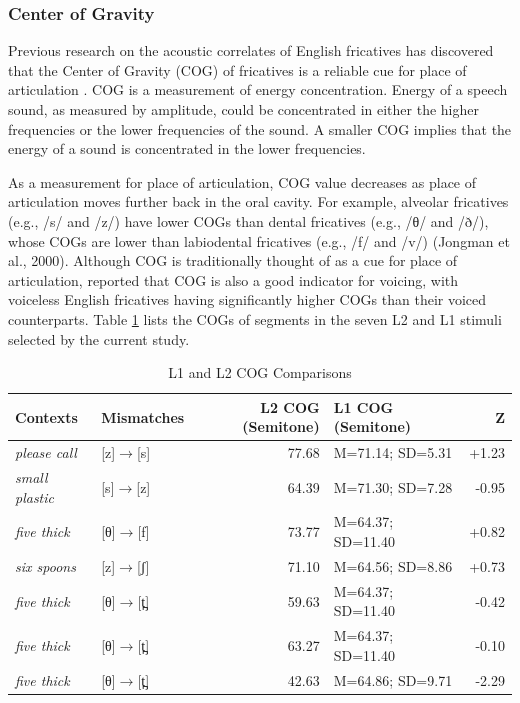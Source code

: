 \subsubsection{Center of Gravity}

Previous research on the acoustic correlates of English fricatives has discovered that the Center of Gravity (COG) of fricatives is a reliable cue for place of articulation \citep{Jongman_2000}. COG is a measurement of energy concentration. Energy of a speech sound, as measured by amplitude, could be concentrated in either the higher frequencies or the lower frequencies of the sound. A smaller COG implies that the energy of a sound is concentrated in the lower frequencies. 

As a measurement for place of articulation, COG value decreases as place of articulation moves further back in the oral cavity. For example, alveolar fricatives (e.g., /s/ and /z/) have lower COGs than dental fricatives (e.g., /θ/ and /ð/), whose COGs are lower than labiodental fricatives (e.g., /f/ and /v/) (Jongman et al., 2000). Although COG is traditionally thought of as a cue for place of articulation, \citet{Jongman_2000} reported that COG is also a good indicator for voicing, with voiceless English fricatives having significantly higher COGs than their voiced counterparts. Table \ref{table:cog} lists the COGs of segments in the seven L2 and L1 stimuli selected by the current study.

\begin{table}[h]
  \figSpace
  \centering
  \caption{L1 and L2 COG Comparisons}
\label{table:cog}
    \begin{tabular}{llrlr}
    \toprule
    Contexts & Mismatches & L2 COG (Semitone) & L1 COG (Semitone)&Z \\
    \midrule
    \textit{please call} & [z]$\rightarrow$[s] & 77.68 & M=71.14; SD=5.31 & +1.23 \\
    \textit{small plastic} & [s]$\rightarrow$[z] & 64.39 & M=71.30; SD=7.28 & -0.95 \\
    \textit{five thick} & [θ]$\rightarrow$[f] & 73.77 & M=64.37; SD=11.40 & +0.82 \\
    \textit{six spoons} & [z]$\rightarrow$[ʃ] & 71.10  & M=64.56; SD=8.86 & +0.73 \\
\textit{five thick}& [θ]$\rightarrow$[t̪] & 59.63 & M=64.37; SD=11.40 & -0.42 \\
\textit{five thick}& [θ]$\rightarrow$[t̪] & 63.27 & M=64.37; SD=11.40 & -0.10 \\
  \textit{five thick}& [θ]$\rightarrow$[t̪] & 42.63 & M=64.86; SD=9.71 & -2.29 \\
    \bottomrule
    \end{tabular}%
  \figSpace
\end{table}%

